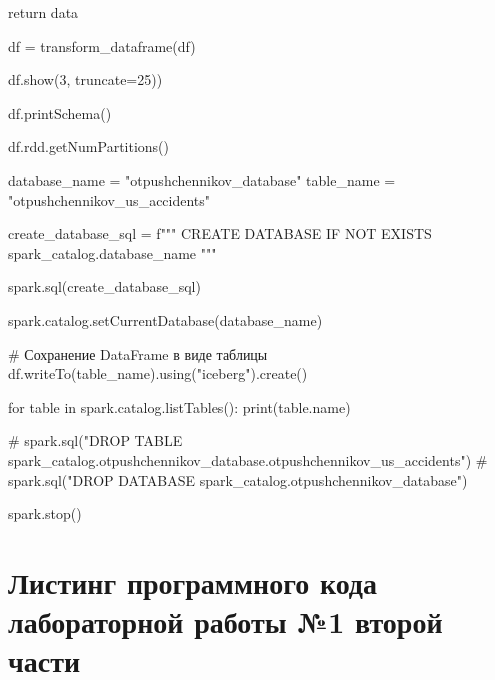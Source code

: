 \begin{code}
    return data

df = transform_dataframe(df)

df.show(3, truncate=25))

df.printSchema()

df.rdd.getNumPartitions()

database_name = "otpushchennikov_database"
table_name = "otpushchennikov_us_accidents"

create_database_sql = f"""
CREATE DATABASE IF NOT EXISTS spark_catalog.{database_name}
"""

spark.sql(create_database_sql)

spark.catalog.setCurrentDatabase(database_name)

# Сохранение DataFrame в виде таблицы
df.writeTo(table_name).using("iceberg").create()

for table in spark.catalog.listTables():
    print(table.name)

# spark.sql("DROP TABLE spark_catalog.otpushchennikov_database.otpushchennikov_us_accidents")
# spark.sql("DROP DATABASE spark_catalog.otpushchennikov_database")

spark.stop()
\end{code}

\chapter{Листинг программного кода лабораторной работы №1 второй части}\label{app:B}\vspace{\baselineskip}

